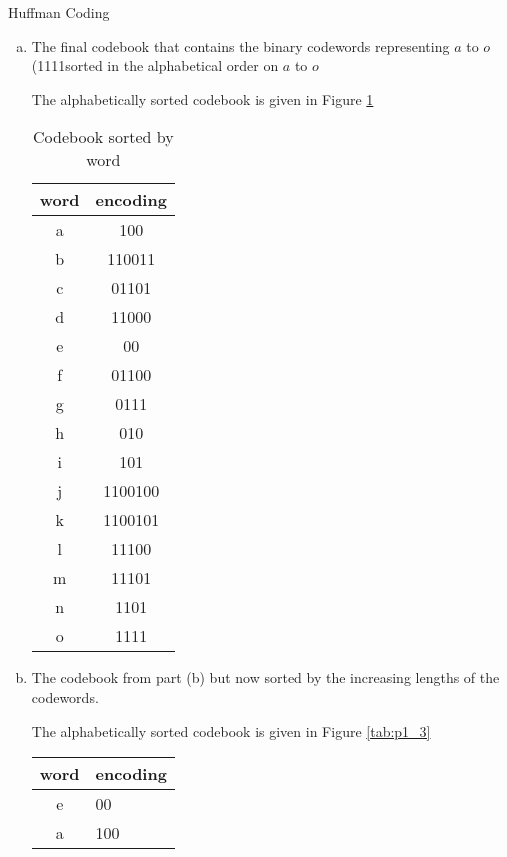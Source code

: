 \documentclass{article}
\numberwithin{table}{section}
\numberwithin{figure}{section}
\begin{document}
\begin{section}{Huffman Coding}
\begin{enumerate}[(a)]
    \item The final codebook that contains the binary codewords representing $a$ to $o$ (1111sorted in the alphabetical order on $a$ to $o$
    \begin{tcolorbox}
        The alphabetically sorted codebook is given in Figure \ref{tab:p1_2}
        \begin{table}[H]
            \centering
            \begin{tabular}{|c|c|}
                \hline
                word & encoding \\
                \hline
                a & 100 \\
                b & 110011 \\
                c & 01101 \\
                d & 11000 \\
                e & 00 \\
                f & 01100 \\
                g & 0111 \\
                h & 010 \\
                i & 101 \\
                j & 1100100 \\
                k & 1100101 \\
                l & 11100 \\
                m & 11101 \\
                n & 1101 \\
                o & 1111 \\
                \hline
            \end{tabular}
            \caption{Codebook sorted by word}
            \label{tab:p1_2}
        \end{table}
    \end{tcolorbox}
    \item The codebook from part (b) but now sorted by the increasing lengths of the codewords.
    \begin{tcolorbox}
        The alphabetically sorted codebook is given in Figure \ref{tab:p1_3}
        \begin{table}[H]
            \centering
            \begin{tabular}{|c|l|}
                \hline
                word & encoding \\
                \hline
                    e & 00 \\
                    a & 100 \\

\end{tabular}
\end{table}
\end{tcolorbox}
\end{enumerate}
\end{section}
\end{document}
